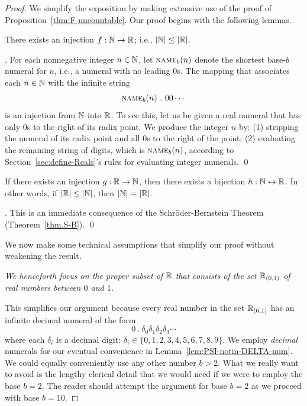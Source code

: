 \smallskip

\begin{proof}
We simplify the exposition by making extensive use of the proof of Proposition~\ref{thm:F-uncountable}.  Our proof begins with the following lemmas.

\smallskip

\begin{lemma}
\label{lem:N-leq-R}
There exists an injection $f: \mathbb{N} \rightarrow \mathbb{R}$; i.e., $|\mathbb{N}| \leq |\mathbb{R}|$.
\end{lemma}

.
For each nonnegative integer $n \in \mathbb{N}$, let $\mbox{\sc name}_b(n)$ denote the shortest base-$b$ numeral for $n$, i.e., a numeral with no leading $0$s.  The mapping that associates each $n \in \mathbb{N}$ with the infinite string
\[ \mbox{\sc name}_b(n) \ . \ 00 \cdots \]
is an injection from $\mathbb{N}$ into $\mathbb{R}$.  To see this, let us be given a real numeral that has only $0$s to the right of its radix point.  We produce the integer $n$ by: (1) stripping the numeral of its radix point and all $0$s to the right of the point; (2) evaluating the remaining string of digits, which is $\mbox{\sc name}_b(n)$, according to Section~\ref{sec:define-Reals}'s rules for evaluating integer numerals.  \qed

\smallskip

\begin{lemma}
\label{lem:N-=-R}
If there exists an injection $g: \mathbb{R} \rightarrow \mathbb{N}$, then there exists a bijection  $h: \mathbb{N} \leftrightarrow \mathbb{R}$.  In other words, if $|\mathbb{R}| \leq |\mathbb{N}|$, then $|\mathbb{N}| = |\mathbb{R}|$.
\end{lemma}

.
This is an immediate consequence of the Schr\"{o}der-Bernstein Theorem (Theorem~\ref{thm.S-B}).  \qed

\medskip

We now make some technical assumptions that simplify our proof without weakening the result.

\smallskip

\noindent
{\em We henceforth focus on the proper subset of $\mathbb{R}$ that consists of the set $\mathbb{R}_{(0,1)}$ of real numbers between $0$ and $1$.}

\smallskip

This simplifies our argument because every real number in the set $\mathbb{R}_{(0,1)}$ has an infinite decimal numeral of the form
\[ 0 \ . \ \delta_0 \delta_1 \delta_2 \delta_3 \cdots \]
where each $\delta_i$ is a decimal digit: $\delta_i \in \{0, 1, 2, 3, 4, 5, 6, 7, 8, 9\}$.  We employ {\em decimal} numerals for our eventual convenience in Lemma~\ref{lem:PSI-notin-DELTA-num}.  We could equally conveniently use any other number $b >2$.  What we really want to avoid is the lengthy clerical detail that we would need if we were to employ the base $b=2$.  The reader should attempt the argument for base $b=2$ as we proceed with base $b=10$.


\end{proof}
